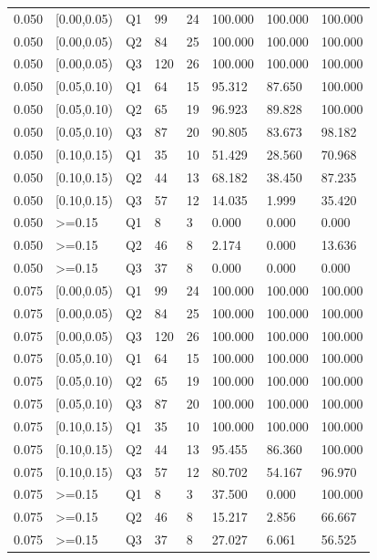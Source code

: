 \begin{tabular}{llllllll}
0.050 & [0.00,0.05) & Q1 & 99 & 24 & 100.000 & 100.000 & 100.000 \\
0.050 & [0.00,0.05) & Q2 & 84 & 25 & 100.000 & 100.000 & 100.000 \\
0.050 & [0.00,0.05) & Q3 & 120 & 26 & 100.000 & 100.000 & 100.000 \\
0.050 & [0.05,0.10) & Q1 & 64 & 15 & 95.312 & 87.650 & 100.000 \\
0.050 & [0.05,0.10) & Q2 & 65 & 19 & 96.923 & 89.828 & 100.000 \\
0.050 & [0.05,0.10) & Q3 & 87 & 20 & 90.805 & 83.673 & 98.182 \\
0.050 & [0.10,0.15) & Q1 & 35 & 10 & 51.429 & 28.560 & 70.968 \\
0.050 & [0.10,0.15) & Q2 & 44 & 13 & 68.182 & 38.450 & 87.235 \\
0.050 & [0.10,0.15) & Q3 & 57 & 12 & 14.035 & 1.999 & 35.420 \\
0.050 & >=0.15 & Q1 & 8 & 3 & 0.000 & 0.000 & 0.000 \\
0.050 & >=0.15 & Q2 & 46 & 8 & 2.174 & 0.000 & 13.636 \\
0.050 & >=0.15 & Q3 & 37 & 8 & 0.000 & 0.000 & 0.000 \\
0.075 & [0.00,0.05) & Q1 & 99 & 24 & 100.000 & 100.000 & 100.000 \\
0.075 & [0.00,0.05) & Q2 & 84 & 25 & 100.000 & 100.000 & 100.000 \\
0.075 & [0.00,0.05) & Q3 & 120 & 26 & 100.000 & 100.000 & 100.000 \\
0.075 & [0.05,0.10) & Q1 & 64 & 15 & 100.000 & 100.000 & 100.000 \\
0.075 & [0.05,0.10) & Q2 & 65 & 19 & 100.000 & 100.000 & 100.000 \\
0.075 & [0.05,0.10) & Q3 & 87 & 20 & 100.000 & 100.000 & 100.000 \\
0.075 & [0.10,0.15) & Q1 & 35 & 10 & 100.000 & 100.000 & 100.000 \\
0.075 & [0.10,0.15) & Q2 & 44 & 13 & 95.455 & 86.360 & 100.000 \\
0.075 & [0.10,0.15) & Q3 & 57 & 12 & 80.702 & 54.167 & 96.970 \\
0.075 & >=0.15 & Q1 & 8 & 3 & 37.500 & 0.000 & 100.000 \\
0.075 & >=0.15 & Q2 & 46 & 8 & 15.217 & 2.856 & 66.667 \\
0.075 & >=0.15 & Q3 & 37 & 8 & 27.027 & 6.061 & 56.525 \\
\hline
\end{tabular}
